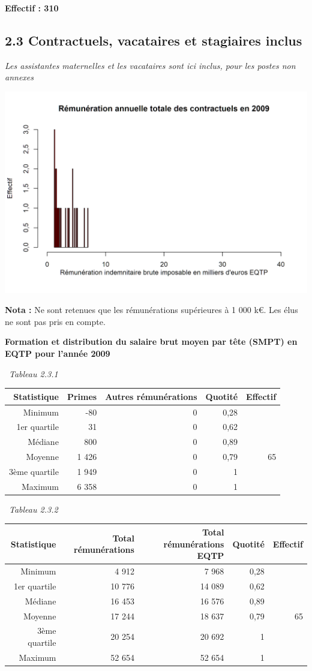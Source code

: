 \textbf{Effectif : 310 }

\hypertarget{contractuels-vacataires-et-stagiaires-inclus}{%
\subsection{2.3 Contractuels, vacataires et stagiaires
inclus}\label{contractuels-vacataires-et-stagiaires-inclus}}

\emph{Les assistantes maternelles et les vacataires sont ici inclus,
pour les postes non annexes}

\includegraphics{altair_files/figure-latex/unnamed-chunk-61-1.png}

\textbf{Nota :} Ne sont retenues que les rémunérations supérieures à 1
000 k€. Les élus ne sont pas pris en compte.

\textbf{Formation et distribution du salaire brut moyen par tête (SMPT)
en EQTP pour l'année 2009 }

~\emph{Tableau 2.3.1}

\begin{longtable}[]{@{}rrrrr@{}}
\toprule
Statistique & Primes & Autres rémunérations & Quotité &
Effectif\tabularnewline
\midrule
\endhead
Minimum & -80 & 0 & 0,28 &\tabularnewline
1er quartile & 31 & 0 & 0,62 &\tabularnewline
Médiane & 800 & 0 & 0,89 &\tabularnewline
Moyenne & 1 426 & 0 & 0,79 & 65\tabularnewline
3ème quartile & 1 949 & 0 & 1 &\tabularnewline
Maximum & 6 358 & 0 & 1 &\tabularnewline
\bottomrule
\end{longtable}

~\emph{Tableau 2.3.2}

\begin{longtable}[]{@{}rrrrr@{}}
\toprule
Statistique & Total rémunérations & Total rémunérations EQTP & Quotité &
Effectif\tabularnewline
\midrule
\endhead
Minimum & 4 912 & 7 968 & 0,28 &\tabularnewline
1er quartile & 10 776 & 14 089 & 0,62 &\tabularnewline
Médiane & 16 453 & 16 576 & 0,89 &\tabularnewline
Moyenne & 17 244 & 18 637 & 0,79 & 65\tabularnewline
3ème quartile & 20 254 & 20 692 & 1 &\tabularnewline
Maximum & 52 654 & 52 654 & 1 &\tabularnewline
\bottomrule
\end{longtable}

